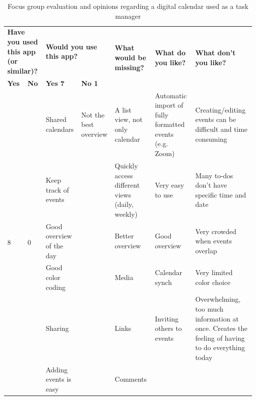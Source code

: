 \FloatBarrier
\begin{table}[!htbp]
    \centering
    \begin{adjustbox}{width=1.2\textwidth,center=\textwidth}
        \begin{tabular}{|l|l|l|l|l|l|l|}
        \hline
        \multicolumn{2}{|l}{\textbf{Have you used this app (or similar)?}} & \multicolumn{2}{|l|}{\textbf{Would you use this app?}} & \multirow{2}{*}{\textbf{What would be missing?}} & \multirow{2}{*}{\textbf{What do you like?}} & \multirow{2}{*}{\textbf{What don't you like?}} \\ \cline{1-4}
        \textbf{Yes} & \textbf{No} & \textbf{Yes    7} & \textbf{No   1} & & & \\
        \hline
        \multirow{6}{*}{ 8 } & \multirow{6}{*}{ 0 } & Shared calendars & Not the best overview & A list view, not only calendar & Automatic import of fully formatted events (e.g. Zoom) & Creating/editing events can be difficult and time consuming \\ \cline{3-7}
        & & Keep track of events & & Quickly access different views (daily, weekly) & Very easy to use & Many to-dos don't have specific time and date \\ \cline{3-7}
        & & Good overview of the day & & Better overview & Good overview & Very crowded when events overlap \\ \cline{3-7}
        & & Good color coding & & Media & Calendar synch & Very limited color choice \\ \cline{3-7}
        & & Sharing & & Links & Inviting others to events & Overwhelming, too much information at once. Creates the feeling of having to do everything today \\ \cline{3-7}
        & & Adding events is easy & & Comments & & \\ \hline
        \end{tabular}
    \end{adjustbox}
    \caption{Focus group evaluation and opinions regarding a digital calendar used as a task manager}
    \label{tab:calendarEval}
\end{table}
\FloatBarrier

